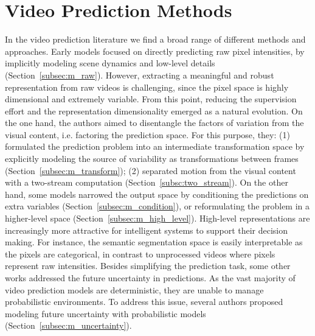 \section{Video Prediction Methods}
\label{cha:videoprediction:sec:methods}
%
In the video prediction literature we find a broad range of different methods and approaches. Early models focused on directly predicting raw pixel intensities, by implicitly modeling scene dynamics and low-level details (Section~\ref{subsec:m_raw}). However, extracting a meaningful and robust representation from raw videos is challenging, since the pixel space is highly dimensional and extremely variable. From this point, reducing the supervision effort and the representation dimensionality emerged as a natural evolution. On the one hand, the authors aimed to disentangle the factors of variation from the visual content, i.e. factoring the prediction space. For this purpose, they: (1) formulated the prediction problem into an intermediate transformation space by explicitly modeling the source of variability as transformations between frames (Section~\ref{subsec:m_transform}); (2) separated motion from the visual content with a two-stream computation (Section~\ref{subsc:two_stream}). On the other hand, some models narrowed the output space by conditioning the predictions on extra variables (Section~\ref{subsec:m_condition}), or reformulating the problem in a higher-level space (Section~\ref{subsec:m_high_level}). High-level representations are increasingly more attractive for intelligent systems to support their decision making. For instance, the semantic segmentation space is easily interpretable as the pixels are categorical, in contrast to unprocessed videos where pixels represent raw intensities. Besides simplifying the prediction task, some other works addressed the future uncertainty in predictions. As the vast majority of video prediction models are deterministic, they are unable to manage probabilistic environments. To address this issue, several authors proposed modeling future uncertainty with probabilistic models (Section~\ref{subsec:m_uncertainty}). 

